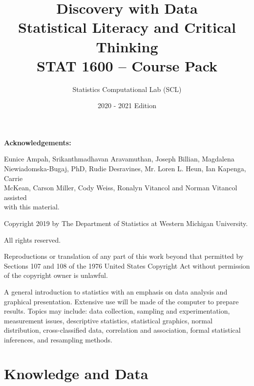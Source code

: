 \documentclass[11pt]{book}\usepackage[]{graphicx}\usepackage[]{color}
\title{Discovery with Data \\ Statistical Literacy and Critical Thinking \\ STAT 1600 -- Course Pack}
\author{Statistics Computational Lab (SCL)}
\date{2020 - 2021 Edition}  %
\begin{document}
\maketitle


\begin{center} \textbf{Acknowledgements:}
\end{center}

Eunice Ampah, Srikanthmadhavan Aravamuthan, Joseph Billian, Magdalena \\ Niewiadomska-Bugaj, PhD, Rudie Desravines, Mr. Loren L. Heun, Ian Kapenga, Carrie \\ McKean, Carson Miller, Cody Weiss, Ronalyn Vitancol and Norman Vitancol assisted \\ with  this material.

\vspace{11cm}

Copyright 2019 by The Department of Statistics at Western Michigan University.

All rights reserved.

Reproductions or translation of any part of this work beyond that permitted by Sections 107 and 108 of the 1976 United States Copyright Act without permission of the copyright owner is unlawful.

A general introduction to statistics with an emphasis on data analysis and graphical presentation. Extensive use will be made of the computer to prepare results. Topics may include: data collection, sampling and experimentation, measurement issues, descriptive statistics, statistical graphics, normal distribution, cross-classified data, correlation and association, formal statistical inferences, and resampling methods.

\overfullrule=1cm

\tableofcontents




\chapter{Knowledge and Data}
\label{chap:ch1}
\end{document}
